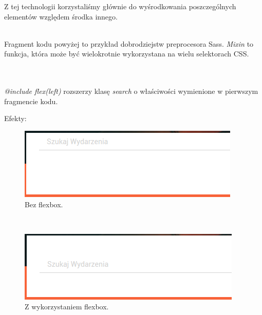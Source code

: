 Z tej technologii korzystaliśmy głównie do wyśrodkowania poszczególnych elementów względem środka innego.

\begin{code}
	
\end{code}\\

Fragment kodu powyżej to przykład dobrodziejstw preprocesora Sass. \emph{Mixin} to funkcja, która może być wielokrotnie wykorzystana na wielu selektorach CSS.\\\\

\begin{code}
	
\end{code}\\

\emph{@include flex(left)} rozszerzy klasę \emph{search} o właściwości wymienione w pierwszym fragmencie kodu.

\clearpage

Efekty:
\begin{figure}[h]
	\centering
  \includegraphics[scale=0.8]{images/flex_before.png}
  \caption{Bez flexbox.}
\end{figure}\\

\begin{figure}[h]
	\centering
  \includegraphics[scale=0.8]{images/flex_after.png}
  \caption{Z wykorzystaniem flexbox.}
\end{figure}

